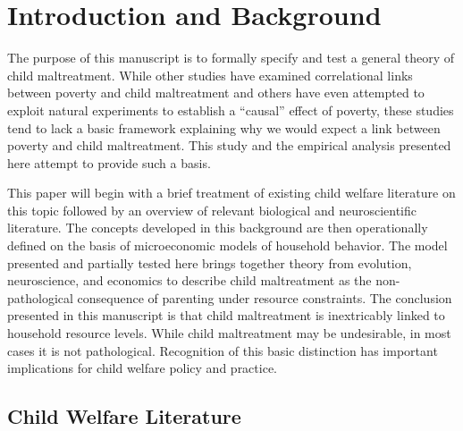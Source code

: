 \documentclass[review]{elsarticle}\usepackage[]{graphicx}\usepackage[]{color}
\begin{document}
\linenumbers

\section{Introduction and Background}\label{introduction-and-background}

The purpose of this manuscript is to formally specify and test a general
theory of child maltreatment. While other studies have examined
correlational links between poverty and child maltreatment and others
have even attempted to exploit natural experiments to establish a
``causal'' effect of poverty, these studies tend to lack a basic
framework explaining why we would expect a link between poverty and
child maltreatment. This study and the empirical analysis presented here
attempt to provide such a basis.

This paper will begin with a brief treatment of existing child welfare
literature on this topic followed by an overview of relevant biological
and neuroscientific literature. The concepts developed in this
background are then operationally defined on the basis of microeconomic
models of household behavior. The model presented and partially tested
here brings together theory from evolution, neuroscience, and economics
to describe child maltreatment as the non-pathological consequence of
parenting under resource constraints. The conclusion presented in this
manuscript is that child maltreatment is inextricably linked to
household resource levels. While child maltreatment may be undesirable,
in most cases it is not pathological. Recognition of this basic
distinction has important implications for child welfare policy and
practice.

\subsection{Child Welfare Literature}\label{child-welfare-literature}
\end{document}
